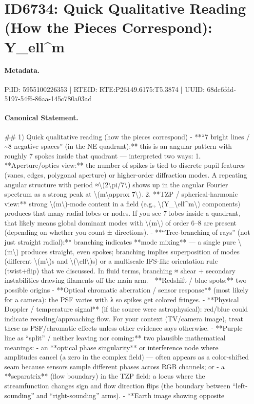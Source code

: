 \section*{ID6734: Quick Qualitative Reading (How the Pieces Correspond): Y\_ell\textasciicircum{}m}
\paragraph{Metadata.}
PiID: 5955100226353 | RTEID: RTE:P26149.6175:T5.3874 | UUID: 68dc6fdd-5197-54f6-86aa-145c780a03ad

\paragraph{Canonical Statement.}
\#\# 1) Quick qualitative reading (how the pieces correspond) - **“7 bright lines / \textasciitilde{}8 negative spaces” (in the NE quadrant):** this is an angular pattern with roughly 7 spokes inside that quadrant — interpreted two ways: 1. **Aperture/optics view:** the number of spikes is tied to discrete pupil features (vanes, edges, polygonal aperture) or higher-order diffraction modes. A repeating angular structure with period ≈\textbackslash{}(2\textbackslash{}pi/7\textbackslash{}) shows up in the angular Fourier spectrum as a strong peak at \textbackslash{}(m\textbackslash{}approx 7\textbackslash{}). 2. **TZP / spherical-harmonic view:** strong \textbackslash{}(m\textbackslash{})-mode content in a field (e.g., \textbackslash{}(Y\_\textbackslash{}ell\textasciicircum{}m\textbackslash{}) components) produces that many radial lobes or nodes. If you see 7 lobes inside a quadrant, that likely means global dominant modes with \textbackslash{}(m\textbackslash{}) of order 6–8 are present (depending on whether you count ± directions). - **“Tree-branching of rays” (not just straight radial):** branching indicates **mode mixing** — a single pure \textbackslash{}(m\textbackslash{}) produces straight, even spokes; branching implies superposition of modes (different \textbackslash{}(m\textbackslash{})s and \textbackslash{}(\textbackslash{}ell\textbackslash{})s) or a multiscale IFS-like orientation rule (twist+flip) that we discussed. In fluid terms, branching ≈ shear + secondary instabilities drawing filaments off the main arm. - **Redshift / blue spots:** two possible origins - **Optical chromatic aberration / sensor response** (most likely for a camera): the PSF varies with λ so spikes get colored fringes. - **Physical Doppler / temperature signal** (if the source were astrophysical): red/blue could indicate receding/approaching flow. For your context (TV/camera image), treat these as PSF/chromatic effects unless other evidence says otherwise. - **Purple line as “split” / neither leaving nor coming:** two plausible mathematical meanings: - an **optical phase singularity** or interference node where amplitudes cancel (a zero in the complex field) — often appears as a color-shifted seam because sensors sample different phases across RGB channels; or - a **separatrix** (flow boundary) in the TZP field: a locus where the streamfunction changes sign and flow direction flips (the boundary between “left-sounding” and “right-sounding” arms). - **Earth image showing opposite 